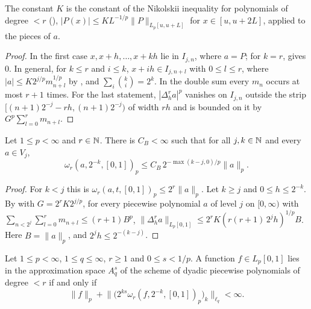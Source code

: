 The constant $K$ is the constant of the Nikolskii inequality for polynomials of degree $< r$
(), $|P(x)| \leq K L^{-1/p} \|P\|_{L_p[u, u + L]}$ for
$x \in [u, u + 2L]$, applied to the pieces of $a$.

\begin{proof}
\leanok
In the first case $x, x + h, \dots, x + kh$ lie in $I_{j,n}$, where $a = P$; for $k = r$,
 gives $0$. In general, for $k \leq r$ and $i \leq k$,
$x + ih \in I_{j, n+l}$ with $0 \leq l \leq r$, where $|a| \leq K 2^{j/p} m_{n+l}^{1/p}$ by
, and $\sum_i \binom{k}{i} = 2^k$. In the double sum every $m_n$
occurs at most $r + 1$ times. For the last statement, $|\Delta_h^r a|^p$ vanishes on $I_{j,n}$
outside the strip $[(n+1)2^{-j} - rh, (n+1)2^{-j})$ of width $rh$ and is bounded on it by
$G^p \sum_{l=0}^r m_{n+l}$.
\end{proof}

\begin{theorem}
\label{thm:pp-inverse}
\leanok
{}
Let $1 \leq p < \infty$ and $r \in \mathbb{N}$. There is $C_B < \infty$ such that for all $j, k \in \mathbb{N}$
and every $a \in V_j$,
\[
  \omega_r(a, 2^{-k}, [0, 1])_p \leq C_B \, 2^{-\max(k - j, 0)/p} \|a\|_p .
\]
\end{theorem}

\begin{proof}
\leanok
For $k < j$ this is $\omega_r(a, t, [0,1])_p \leq 2^r \|a\|_p$. Let $k \geq j$ and
$0 \leq h \leq 2^{-k}$. By  with $G = 2^r K 2^{j/p}$, for every piecewise
polynomial $a$ of level $j$ on $[0, \infty)$ with
$\sum_{n < 2^j} \sum_{l=0}^r m_{n+l} \leq (r+1) B^p$,
$\|\Delta_h^r a\|_{L_p[0, 1]} \leq 2^r K (r (r+1) \, 2^j h)^{1/p} B$. Here $B = \|a\|_p$,
and $2^j h \leq 2^{-(k-j)}$.
\end{proof}

\begin{theorem}
\label{thm:pp-besov}
\leanok
{}
Let $1 \leq p < \infty$, $1 \leq q \leq \infty$, $r \geq 1$ and $0 \leq s < 1/p$. A function
$f \in L_p[0,1]$ lies in the approximation space $A^s_q$ of the scheme of dyadic piecewise
polynomials of degree $< r$ if and only if
\[
  \|f\|_p + \bigl\| \bigl( 2^{ks} \omega_r(f, 2^{-k}, [0,1])_p \bigr)_k \bigr\|_{\ell_q} < \infty .
\]
\end{theorem}

